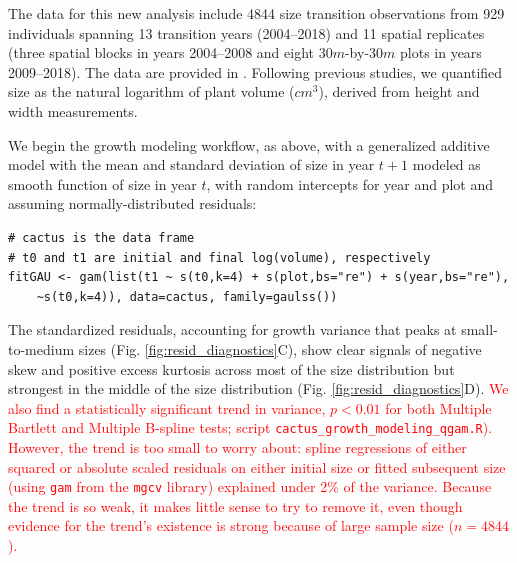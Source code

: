 \documentclass[12pt]{article}
\newcommand{\new}{\textcolor{red}}
\begin{document}
The data for this new analysis include 4844 size transition observations from 929 individuals spanning 13 transition years (2004--2018) and 11 spatial replicates (three spatial blocks in years 2004--2008 and eight $30m$-by-$30m$ plots in years 2009--2018). 
The data are provided in \cite{cactusdata}.
Following previous studies, we quantified size as the natural logarithm of plant volume ($cm^3$), derived from height and width measurements. 

We begin the growth modeling workflow, as above, with a generalized additive model with the mean and standard deviation of size in year $t+1$ modeled as smooth function of size in year $t$, with random intercepts for year and plot and assuming normally-distributed residuals:
\begin{lstlisting}
# cactus is the data frame
# t0 and t1 are initial and final log(volume), respectively
fitGAU <- gam(list(t1 ~ s(t0,k=4) + s(plot,bs="re") + s(year,bs="re"), 
	~s(t0,k=4)), data=cactus, family=gaulss())
\end{lstlisting}
The standardized residuals, accounting for growth variance that peaks at small-to-medium sizes (Fig. \ref{fig:resid_diagnostics}C), show clear signals of negative skew and positive excess kurtosis across most of the size distribution but strongest in the middle of the size distribution (Fig. \ref{fig:resid_diagnostics}D). \new{We also find a statistically significant 
trend in variance, $p<0.01$ for both Multiple Bartlett and Multiple B-spline tests; script \texttt{cactus\_growth\_modeling\_qgam.R}). However, the trend is too small to 
worry about: spline regressions of either squared or absolute scaled residuals on either initial size or fitted subsequent size (using \texttt{gam} from the \texttt{mgcv} library)
explained under 2\% of the variance. Because the trend is so weak, it makes little sense to try to remove it, even though evidence for the trend's existence is strong because of 
large sample size ($n=4844$). } 
\end{document}
